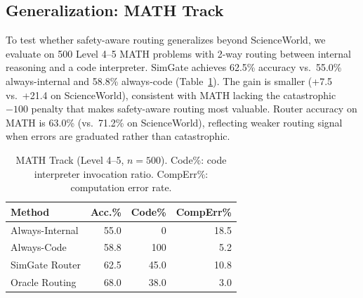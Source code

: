 \documentclass[11pt,a4paper]{article}
\begin{document}
\subsection{Generalization: MATH Track}

To test whether safety-aware routing generalizes beyond ScienceWorld, we evaluate on 500 Level 4--5 MATH problems with 2-way routing between internal reasoning and a code interpreter. SimGate achieves 62.5\% accuracy vs.\ 55.0\% always-internal and 58.8\% always-code (Table~\ref{tab:math}). The gain is smaller (+7.5 vs.\ +21.4 on ScienceWorld), consistent with MATH lacking the catastrophic $-100$ penalty that makes safety-aware routing most valuable. Router accuracy on MATH is 63.0\% (vs.\ 71.2\% on ScienceWorld), reflecting weaker routing signal when errors are graduated rather than catastrophic.

\begin{table}[t]
\centering
\small
\begin{tabular}{@{}lrrr@{}}
\toprule
\textbf{Method} & \textbf{Acc.\%} & \textbf{Code\%} & \textbf{CompErr\%} \\
\midrule
Always-Internal & 55.0 & 0 & 18.5 \\
Always-Code & 58.8 & 100 & 5.2 \\
SimGate Router & 62.5 & 45.0 & 10.8 \\
Oracle Routing & 68.0 & 38.0 & 3.0 \\
\bottomrule
\end{tabular}
\caption{MATH Track (Level 4--5, $n{=}500$). Code\%: code interpreter invocation ratio. CompErr\%: computation error rate.}
\label{tab:math}
\end{table}
\end{document}
